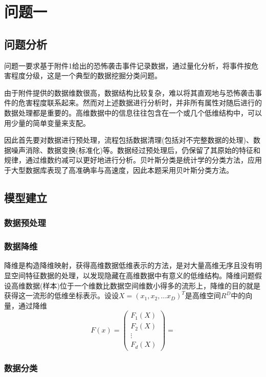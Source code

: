 \documentclass[bwprint]{gmcmthesis}
\begin{document}
\section{问题一}

\subsection{问题分析}
问题一要求基于附件1给出的恐怖袭击事件记录数据，通过量化分析，将事件按危害程度分级，这是一个典型的数据挖掘分类问题。

由于附件提供的数据维数很高，数据结构比较复杂，难以将其直观地与恐怖袭击事件的危害程度联系起来。然而对上述数据进行分析时，并非所有属性对随后进行的数据处理都是重要的。高维数据中的信息往往包含在一个或几个低维结构中，可以用少量的简单变量来支配。

因此首先要对数据进行预处理，流程包括数据清理(包括对不完整数据的处理)、数据噪声消除、数据变换(标准化)等。数据经过预处理后，仍保留了其原始的特征和规律，通过维数约减可以更好地进行分析。贝叶斯分类是统计学的分类方法，应用于大型数据库表现了高准确率与高速度，因此本题采用贝叶斯分类方法。


\subsection{模型建立}
\subsubsection{数据预处理}
\subsubsection{数据降维}
降维是构造降维映射，获得高维数据低维表示的方法，是对大量高维无序且没有明显空间特征数据的处理，以发现隐藏在高维数据中有意义的低维结构。降维问题假设高维数据(样本)位于一个维数比数据空间维数小得多的流形上，降维的目的就是获得这一流形的低维坐标表示。设设$\mathit{X}=(x_1,x_2,...x_D)^T$是高维空间$R^D$中的向量，通过降维
\begin{equation}
\mathit{F}(x)=\left( \begin{matrix}{}
\mathit{F}_1(X) \\ 
\mathit{F}_2(X) \\ 
\vdots \\ 
\mathit{F}_d(X)
\end{matrix}\right) =
\end{equation}

\subsubsection{数据分类}
\end{document}
